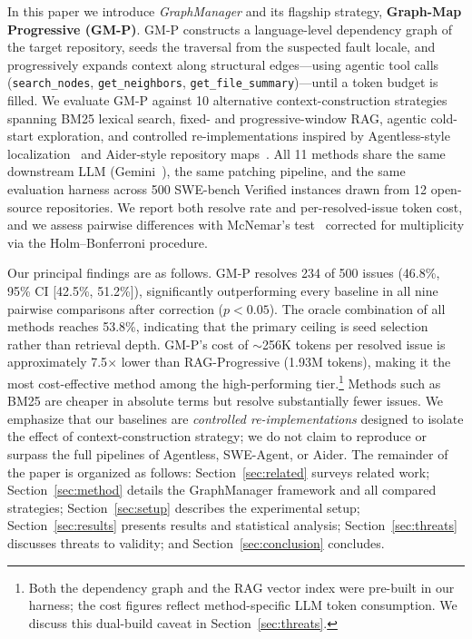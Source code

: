 In this paper we introduce \emph{GraphManager} and its flagship strategy, \textbf{Graph-Map Progressive (GM-P)}. GM-P constructs a language-level dependency graph of the target repository, seeds the traversal from the suspected fault locale, and progressively expands context along structural edges---using agentic tool calls (\texttt{search\_nodes}, \texttt{get\_neighbors}, \texttt{get\_file\_summary})---until a token budget is filled. We evaluate GM-P against 10 alternative context-construction strategies spanning BM25 lexical search, fixed- and progressive-window RAG, agentic cold-start exploration, and controlled re-implementations inspired by Agentless-style localization~\cite{xia2024agentless} and Aider-style repository maps~\cite{aider2023}. All 11 methods share the same downstream LLM (Gemini~\cite{gemini2024}), the same patching pipeline, and the same evaluation harness across 500 SWE-bench Verified instances drawn from 12 open-source repositories. We report both resolve rate and per-resolved-issue token cost, and we assess pairwise differences with McNemar's test~\cite{mcnemar1947} corrected for multiplicity via the Holm--Bonferroni procedure.

Our principal findings are as follows. GM-P resolves 234 of 500 issues (46.8\%, 95\% CI [42.5\%, 51.2\%]), significantly outperforming every baseline in all nine pairwise comparisons after correction ($p < 0.05$). The oracle combination of all methods reaches 53.8\%, indicating that the primary ceiling is seed selection rather than retrieval depth. GM-P's cost of ${\sim}$256K tokens per resolved issue is approximately 7.5$\times$ lower than RAG-Progressive (1.93M tokens), making it the most cost-effective method among the high-performing tier.\footnote{Both the dependency graph and the RAG vector index were pre-built in our harness; the cost figures reflect method-specific LLM token consumption. We discuss this dual-build caveat in Section~\ref{sec:threats}.} Methods such as BM25 are cheaper in absolute terms but resolve substantially fewer issues. We emphasize that our baselines are \emph{controlled re-implementations} designed to isolate the effect of context-construction strategy; we do not claim to reproduce or surpass the full pipelines of Agentless, SWE-Agent, or Aider. The remainder of the paper is organized as follows: Section~\ref{sec:related} surveys related work; Section~\ref{sec:method} details the GraphManager framework and all compared strategies; Section~\ref{sec:setup} describes the experimental setup; Section~\ref{sec:results} presents results and statistical analysis; Section~\ref{sec:threats} discusses threats to validity; and Section~\ref{sec:conclusion} concludes.

